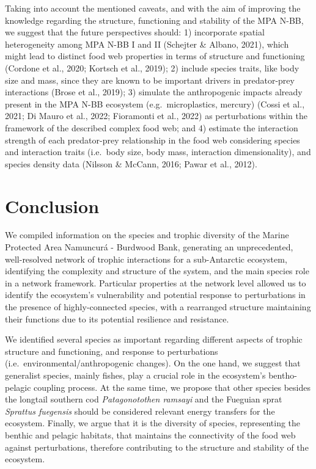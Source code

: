 \documentclass[preprint, 3p,
authoryear]{elsarticle} %
\begin{document}
Taking into account the mentioned caveats, and with the aim of improving
the knowledge regarding the structure, functioning and stability of the
MPA N-BB, we suggest that the future perspectives should: 1) incorporate
spatial heterogeneity among MPA N-BB I and II (Schejter \& Albano,
2021), which might lead to distinct food web properties in terms of
structure and functioning (Cordone et al., 2020; Kortsch et al., 2019);
2) include species traits, like body size and mass, since they are known
to be important drivers in predator-prey interactions (Brose et al.,
2019); 3) simulate the anthropogenic impacts already present in the MPA
N-BB ecosystem (e.g.~microplastics, mercury) (Cossi et al., 2021; Di
Mauro et al., 2022; Fioramonti et al., 2022) as perturbations within the
framework of the described complex food web; and 4) estimate the
interaction strength of each predator-prey relationship in the food web
considering species and interaction traits (i.e.~body size, body mass,
interaction dimensionality), and species density data (Nilsson \&
McCann, 2016; Pawar et al., 2012).

\hypertarget{conclusion}{%
\section{Conclusion}\label{conclusion}}

We compiled information on the species and trophic diversity of the
Marine Protected Area Namuncurá - Burdwood Bank, generating an
unprecedented, well-resolved network of trophic interactions for a
sub-Antarctic ecosystem, identifying the complexity and structure of the
system, and the main species role in a network framework. Particular
properties at the network level allowed us to identify the ecosystem's
vulnerability and potential response to perturbations in the presence of
highly-connected species, with a rearranged structure maintaining their
functions due to its potential resilience and resistance.

We identified several species as important regarding different aspects
of trophic structure and functioning, and response to perturbations
(i.e.~environmental/anthropogenic changes). On the one hand, we suggest
that generalist species, mainly fishes, play a crucial role in the
ecosystem's bentho-pelagic coupling process. At the same time, we
propose that other species besides the longtail southern cod
\emph{Patagonotothen ramsayi} and the Fueguian sprat \emph{Sprattus
fuegensis} should be considered relevant energy transfers for the
ecosystem. Finally, we argue that it is the diversity of species,
representing the benthic and pelagic habitats, that maintains the
connectivity of the food web against perturbations, therefore
contributing to the structure and stability of the ecosystem.
\end{document}
